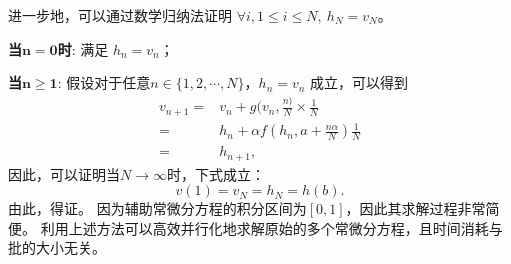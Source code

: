 进一步地，可以通过数学归纳法证明 $\forall i, 1 \leq i \leq N, \ h_N = v_N$。

\textbf{当$\mathbf{n=0}$时}: 满足 $h_n=v_n$；

\textbf{当$\mathbf{n\geq 1}$}: 假设对于任意$n\in\{1,2,\cdots,N\}$，$h_n=v_n$ 成立，可以得到
\begin{equation}
    \begin{aligned}
    v_{n+1} =& v_{n}+g(v_{n}, \frac{n)}{N}\times \frac{1}{N} \\
    =&h_{n}+{{\alpha}}f(h_n, a+\frac{n{\alpha}}{ N})\frac{ 1}{N} \\
    =&h_{n+1},
    \end{aligned}
\end{equation}
因此，可以证明当$N\to\infty$时，下式成立：
\begin{equation}
    v(1)=v_N=h_N=h(b).
\end{equation}
由此，得证。
因为辅助常微分方程的积分区间为$[0,1]$，因此其求解过程非常简便。
利用上述方法可以高效并行化地求解原始的多个常微分方程，且时间消耗与批的大小无关。

